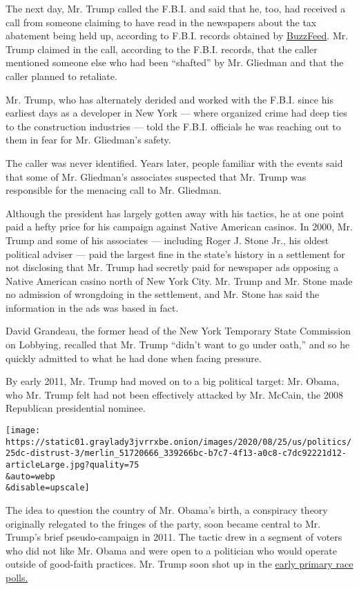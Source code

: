 The next day, Mr. Trump called the F.B.I. and said that he, too, had
received a call from someone claiming to have read in the newspapers
about the tax abatement being held up, according to F.B.I. records
obtained by
\href{https://www.buzzfeednews.com/article/jasonleopold/if-you-keep-fucking-with-mr-trump-we-know-where-you-live\#.cs19XbjNg9)}{BuzzFeed}.
Mr. Trump claimed in the call, according to the F.B.I. records, that the
caller mentioned someone else who had been ``shafted'' by Mr. Gliedman
and that the caller planned to retaliate.

Mr. Trump, who has alternately derided and worked with the F.B.I. since
his earliest days as a developer in New York --- where organized crime
had deep ties to the construction industries --- told the F.B.I.
officials he was reaching out to them in fear for Mr. Gliedman's safety.

The caller was never identified. Years later, people familiar with the
events said that some of Mr. Gliedman's associates suspected that Mr.
Trump was responsible for the menacing call to Mr. Gliedman.

Although the president has largely gotten away with his tactics, he at
one point paid a hefty price for his campaign against Native American
casinos. In 2000, Mr. Trump and some of his associates --- including
Roger J. Stone Jr., his oldest political adviser --- paid the largest
fine in the state's history in a settlement for not disclosing that Mr.
Trump had secretly paid for newspaper ads opposing a Native American
casino north of New York City. Mr. Trump and Mr. Stone made no admission
of wrongdoing in the settlement, and Mr. Stone has said the information
in the ads was based in fact.

David Grandeau, the former head of the New York Temporary State
Commission on Lobbying, recalled that Mr. Trump ``didn't want to go
under oath,'' and so he quickly admitted to what he had done when facing
pressure.

By early 2011, Mr. Trump had moved on to a big political target: Mr.
Obama, who Mr. Trump felt had not been effectively attacked by Mr.
McCain, the 2008 Republican presidential nominee.

\texttt{[image: https://static01.graylady3jvrrxbe.onion/images/2020/08/25/us/politics/25dc-distrust-3/merlin\_51720666\_339266bc-b7c7-4f13-a0c8-c7dc92221d12-articleLarge.jpg?quality=75\\\&auto=webp\\\&disable=upscale]}

The idea to question the country of Mr. Obama's birth, a conspiracy
theory originally relegated to the fringes of the party, soon became
central to Mr. Trump's brief pseudo-campaign in 2011. The tactic drew in
a segment of voters who did not like Mr. Obama and were open to a
politician who would operate outside of good-faith practices. Mr. Trump
soon shot up in the
\href{http://i2.cdn.turner.com/cnn/2011/images/04/12/rel6c.pdf}{early
primary race polls.}

